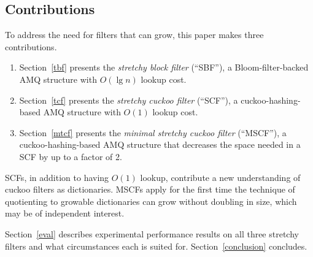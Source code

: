 \documentclass[letterpaper,twocolumn,10pt]{article}
\newcommand{\etal}{et al.}
\newcommand{\taffy}{stretchy}
\newcommand{\TBF}{SBF}
\newcommand{\TCF}{SCF}
\newcommand{\MTCF}{MSCF}
\newcommand{\taffy}{taffy}
\newcommand{\TBF}{TBF}
\newcommand{\TCF}{TCF}
\newcommand{\MTCF}{MTCF}
\begin{document}







\subsection{Contributions}

To address the need for filters that can grow, this paper makes three contributions.

\begin{enumerate}
\item Section~\ref{tbf}  presents the {\em \taffy{} block filter}          (``\TBF{}''),  a Bloom-filter-backed  AMQ structure with $O(\lg n)$ lookup cost.
\item Section~\ref{tcf}  presents the {\em \taffy{} cuckoo filter}         (``\TCF{}''),  a cuckoo-hashing-based AMQ structure with $O(1)$ lookup cost.
\item Section~\ref{mtcf} presents the {\em minimal \taffy{} cuckoo filter} (``\MTCF{}''), a cuckoo-hashing-based AMQ structure that decreases the space needed in a \TCF{} by up to a factor of 2.
\end{enumerate}

\TCF{}s, in addition to having $O(1)$ lookup, contribute a new understanding of cuckoo filters as dictionaries.
\MTCF{}s apply for the first time the technique of quotienting to growable dictionaries can grow without doubling in size, which may be of independent interest.

Section~\ref{eval} describes experimental performance results on all three \taffy{} filters and what circumstances each is suited for. %
Section~\ref{conclusion} concludes.
\end{document}
